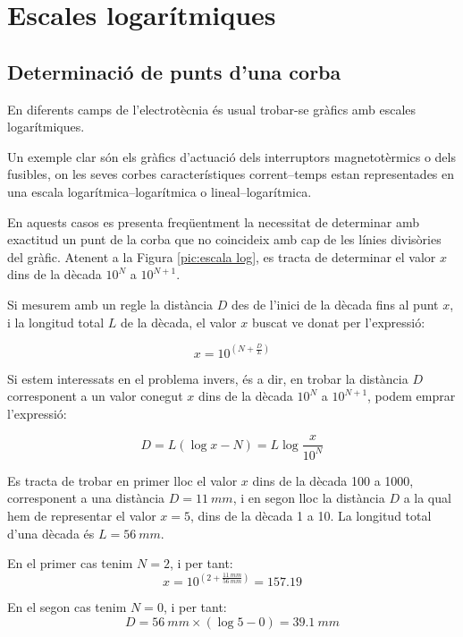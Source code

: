 \section{Escales logarítmiques}\label{sec:escales-log} 

\subsection{Determinació de punts d'una corba}

En diferents camps de l'electrotècnia és usual trobar-se gràfics amb escales
logarítmiques.

Un exemple clar són els gràfics d'actuació dels interruptors magnetotèrmics o dels
fusibles, on les seves corbes característiques corrent--temps estan representades en
una escala logarítmica--logarítmica o lineal--logarítmica.

En aquests casos es presenta freqüentment la necessitat de determinar amb exactitud un
punt de la corba que no coincideix amb cap de les línies divisòries del gràfic. Atenent a
la Figura \vref{pic:escala log}, es tracta de determinar el valor $x$ dins de la dècada
$10^N$ a $10^{N+1}$.

\begin{center}
    
    \label{pic:escala log}
\end{center}

Si mesurem amb un regle la distància $D$ des de l'inici de la dècada fins al punt $x$, i
la longitud total $L$ de la dècada, el valor $x$ buscat ve donat per l'expressió:

\begin{equation}
    x = 10^{\left(N+\frac{D}{L}\right)}
\end{equation}

Si estem interessats en el problema invers, és a dir, en  trobar la distància $D$
corresponent a un valor conegut $x$ dins de la dècada $10^N$ a $10^{N+1}$, podem emprar
l'expressió:

\begin{equation}
    D = L(\log x - N) = L \log\frac{x}{10^N}
\end{equation}

\begin{exemple}
    Es tracta de trobar en primer lloc el valor $x$ dins de la dècada 100 a 1000, corresponent a una
    distància $D=\SI{11}{mm}$, i en segon lloc la distància $D$ a la qual hem de representar el valor $x=5$, dins de la
    dècada 1 a 10. La longitud total d'una dècada és $L=\SI{56}{mm}$.

    En el primer cas tenim $N=2$, i per tant:
    \[
        x = 10^{\left(2+\frac{\SI{11}{mm}}{\SI{56}{mm}}\right)}= \num{157,19}
    \]

    En el segon cas tenim $N=0$, i per tant:
    \[
        D = \SI{56}{mm} \times (\log 5 - 0)  = \SI{39,1}{mm}
    \]

\end{exemple}

